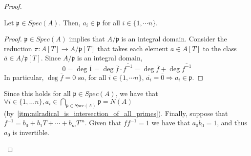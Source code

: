 \begin{problem}
\begin{enumerate}[label=(\theproblem.\arabic*),ref=\theproblem.\arabic*]
\begin{sol}
\begin{proof}
\begin{itemize}
\begin{claim}
                            Let $\mathfrak{p} \in Spec(A)$.
                            Then, $a_i \in \mathfrak{p}$ for all $i \in \{1, \cdots n\}$.
                            \begin{proof}
                                $\mathfrak{p} \in Spec(A)$ implies that $A/\mathfrak{p}$ is an integral domain.
                                Consider the reduction $\pi: A[T] \rightarrow A/\mathfrak{p}[T]$ that takes each element $a \in A[T]$ to the class $\overline{a} \in A/\mathfrak{p}[T]$.
                                Since $A/\mathfrak{p}$ is an integral domain,
                                \[
                                    0 = \deg \bar{1} = \deg \bar{f} \cdot \overline{f^{-1}} =
                                    \deg \bar{f} + \deg \overline{f^{-1}}
                                \]
                                In particular, $\deg \bar{f} = 0$ so, for all $i \in \{1, \cdots n\}$,
                                $\overline{a_i} = \bar{0} \Rightarrow a_i \in \mathfrak{p}$.
                            \end{proof}
                        \end{claim}
                        Since this holds for all $\mathfrak{p} \in Spec(A)$, we have that $ \forall i \in \{1, \ldots n\},
                        a_i \in \bigcap_{\mathfrak{p} \in Spec(A)}\mathfrak{p} = N(A)$ (by~\ref{itm:nilradical_is_intersection_of_all_primes}).
                        Finally, suppose that $f^{-1} = b_0 + b_1 T + \cdots + b_m T^m$.
                        Given that $f f^{-1}=1$ we have that $a_0 b_0 = 1$, and thus $a_0$ is invertible.
                    \end{itemize}
                \end{proof}
            \end{sol}


\end{enumerate}
\end{problem}

